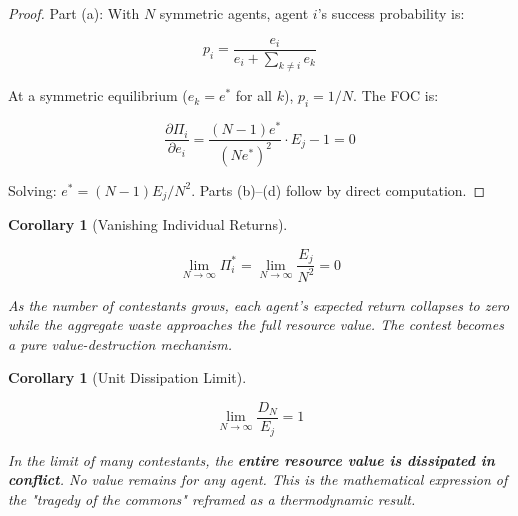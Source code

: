 \documentclass[11pt]{article}
\theoremstyle{plain}
\newtheorem{corollary}[theorem]{Corollary}
\theoremstyle{definition}
\theoremstyle{remark}
\begin{document}
\begin{proof}
Part (a): With $N$ symmetric agents, agent $i$'s success probability is:

$$p_i = \frac{e_i}{e_i + \sum_{k \neq i} e_k}$$

At a symmetric equilibrium ($e_k = e^*$ for all $k$), $p_i = 1/N$. The FOC is:

$$\frac{\partial \Pi_i}{\partial e_i} = \frac{(N-1) e^*}{(N e^*)^2} \cdot E_j - 1 = 0$$

Solving: $e^* = (N-1) E_j / N^2$. Parts (b)–(d) follow by direct computation.
\end{proof}

\begin{corollary}[Vanishing Individual Returns]
\label{cor-vanishing-returns}

$$\lim_{N \to \infty} \Pi_i^* = \lim_{N \to \infty} \frac{E_j}{N^2} = 0$$

As the number of contestants grows, each agent's expected return collapses to zero while the aggregate waste approaches the full resource value. The contest becomes a pure value-destruction mechanism.
\end{corollary}

\begin{corollary}[Unit Dissipation Limit]
\label{cor-unit-dissipation-limit}

$$\lim_{N \to \infty} \frac{D_N}{E_j} = 1$$

In the limit of many contestants, the \textbf{entire resource value is dissipated in conflict}. No value remains for any agent. This is the mathematical expression of the "tragedy of the commons" reframed as a thermodynamic result.
\end{corollary}
\end{document}
